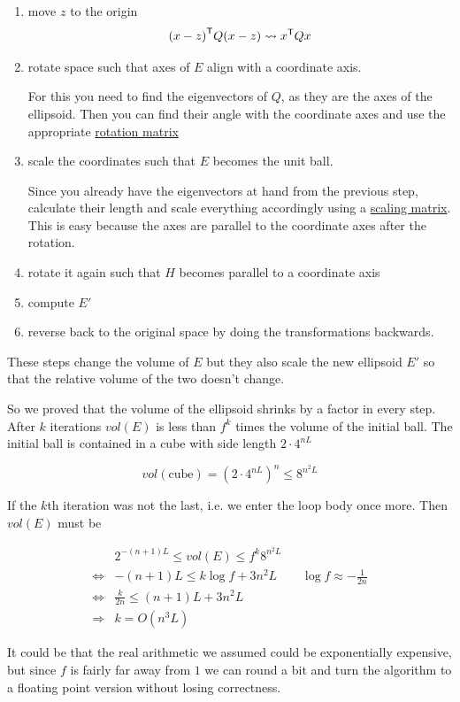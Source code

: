 \begin{enumerate}
\item move $z$ to the origin
\[{(x-z)}^\text{\upshape \sffamily T}Q(x-z) \rightsquigarrow {x}^\text{\upshape \sffamily T}Qx\]
\item rotate space such that axes of $E$ align with a coordinate axis. 

For this you need to find the eigenvectors of $Q$, as they are the axes of the ellipsoid. Then you can find their angle with the coordinate axes and use the appropriate \href{http://en.wikipedia.org/wiki/Rotation\_matrix}{rotation matrix}
\item scale the coordinates such that $E$ becomes the unit ball.

Since you already have the eigenvectors at hand from the previous step, calculate their length and scale everything accordingly using a \href{http://en.wikipedia.org/wiki/Scaling\_matrix}{scaling matrix}. This is easy because the axes are parallel to the coordinate axes after the rotation.
\item rotate it again such that $H$ becomes parallel to a coordinate axis
\item compute $E'$
\item reverse back to the original space by doing the transformations backwards.
\end{enumerate}

These steps change the volume of $E$ but they also scale the new ellipsoid $E'$ so that the relative volume of the two doesn't change.

So we proved that the volume of the ellipsoid shrinks by a factor in every step. After $k$ iterations $vol(E)$ is less than $f^k$ times the volume of the initial ball. The initial ball is contained in a cube with side length $2\cdot 4^{nL}$

\[vol(\text{cube}) = (2 \cdot 4^{nL})^n \leq 8^{n^2L}\]

If the $k$th iteration was not the last, i.e. we enter the loop body once more. Then $vol(E)$ must be

\begin{align*}
&2^{-(n+1)L} \leq vol(E) \leq f^k 8^{n^2L} \\
\Leftrightarrow & -(n+1)L  \leq k\log f + 3n^2 L && \log f \approx -\frac{1}{2n}\\
\Leftrightarrow & \frac{k}{2n} \leq (n+1)L+3n^2L \\
\Rightarrow &k = O(n^3L)
\end{align*}

It could be that the real arithmetic we assumed could be exponentially expensive, but since $f$ is fairly far away from $1$ we can round a bit and turn the algorithm to a floating point version without losing correctness.

